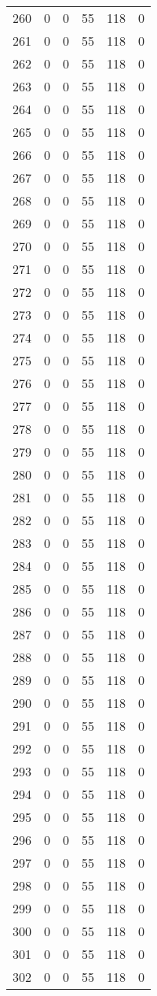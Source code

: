 \documentclass[a4paper]{ctexart}
\begin{document}
\begin{longtable}{p{1cm}|p{2cm}|p{2cm}|p{2cm}|P{2cm}|p{2cm}}
		260&0&0&55&118&0\\
		261&0&0&55&118&0\\
		262&0&0&55&118&0\\
		263&0&0&55&118&0\\
		264&0&0&55&118&0\\
		265&0&0&55&118&0\\
		266&0&0&55&118&0\\
		267&0&0&55&118&0\\
		268&0&0&55&118&0\\
		269&0&0&55&118&0\\
		270&0&0&55&118&0\\
		271&0&0&55&118&0\\
		272&0&0&55&118&0\\
		273&0&0&55&118&0\\
		274&0&0&55&118&0\\
		275&0&0&55&118&0\\
		276&0&0&55&118&0\\
		277&0&0&55&118&0\\
		278&0&0&55&118&0\\
		279&0&0&55&118&0\\
		280&0&0&55&118&0\\
		281&0&0&55&118&0\\
		282&0&0&55&118&0\\
		283&0&0&55&118&0\\
		284&0&0&55&118&0\\
		285&0&0&55&118&0\\
		286&0&0&55&118&0\\
		287&0&0&55&118&0\\
		288&0&0&55&118&0\\
		289&0&0&55&118&0\\
		290&0&0&55&118&0\\
		291&0&0&55&118&0\\
		292&0&0&55&118&0\\
		293&0&0&55&118&0\\
		294&0&0&55&118&0\\
		295&0&0&55&118&0\\
		296&0&0&55&118&0\\
		297&0&0&55&118&0\\
		298&0&0&55&118&0\\
		299&0&0&55&118&0\\
		300&0&0&55&118&0\\
		301&0&0&55&118&0\\
		302&0&0&55&118&0\\

\end{longtable}
\end{document}
